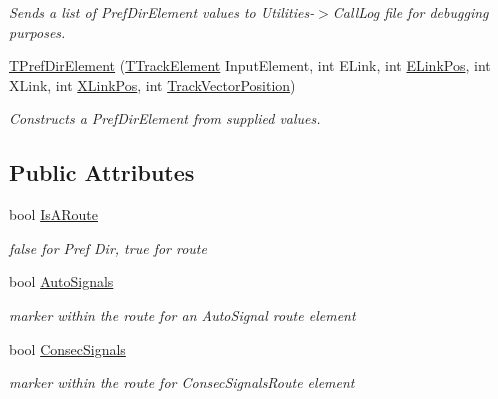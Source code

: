 \begin{DoxyCompactItemize}
\begin{DoxyCompactList}\small\item\em Sends a list of Pref\+Dir\+Element values to Utilities-\/$>$Call\+Log file for debugging purposes. \end{DoxyCompactList}\item 
\mbox{\label{class_t_pref_dir_element_a05688db45c02484229e4d226454ed8f3}} 
\mbox{\hyperlink{class_t_pref_dir_element_a05688db45c02484229e4d226454ed8f3}{T\+Pref\+Dir\+Element}} (\mbox{\hyperlink{class_t_track_element}{T\+Track\+Element}} Input\+Element, int E\+Link, int \mbox{\hyperlink{class_t_pref_dir_element_a6fc026102a01f722e0e13fdddce13ee0}{E\+Link\+Pos}}, int X\+Link, int \mbox{\hyperlink{class_t_pref_dir_element_aff497780d02596e181f762e55b4423c1}{X\+Link\+Pos}}, int \mbox{\hyperlink{class_t_pref_dir_element_a6b0e69b5e5b4143b9d2c5b0f5c091b64}{Track\+Vector\+Position}})
\begin{DoxyCompactList}\small\item\em Constructs a Pref\+Dir\+Element from supplied values. \end{DoxyCompactList}\end{DoxyCompactItemize}
\subsection*{Public Attributes}
\begin{DoxyCompactItemize}
\item 
\mbox{\label{class_t_pref_dir_element_a6aab04763b06d78dfb4e2dc0408fa2e2}} 
bool \mbox{\hyperlink{class_t_pref_dir_element_a6aab04763b06d78dfb4e2dc0408fa2e2}{Is\+A\+Route}}
\begin{DoxyCompactList}\small\item\em false for Pref Dir, true for route \end{DoxyCompactList}\item 
\mbox{\label{class_t_pref_dir_element_a3d9d35355627dda22fa029dc81fa95c0}} 
bool \mbox{\hyperlink{class_t_pref_dir_element_a3d9d35355627dda22fa029dc81fa95c0}{Auto\+Signals}}
\begin{DoxyCompactList}\small\item\em marker within the route for an Auto\+Signal route element \end{DoxyCompactList}\item 
\mbox{\label{class_t_pref_dir_element_a96013ae599fd950932832937cada3b96}} 
bool \mbox{\hyperlink{class_t_pref_dir_element_a96013ae599fd950932832937cada3b96}{Consec\+Signals}}
\begin{DoxyCompactList}\small\item\em marker within the route for Consec\+Signals\+Route element \end{DoxyCompactList}\end{DoxyCompactItemize}
